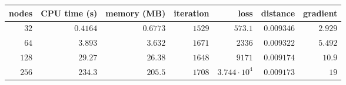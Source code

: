\documentclass[12pt,a4paper]{article}
\begin{document}
\begin{tabular}
{r | r | r | r | r | r | r}
nodes & CPU time (s) & memory (MB) & iteration & loss & distance & gradient \\
\hline
$32$ & $0.4164$ & $0.6773$ & $1529$ & $573.1$ & $0.009346$ & $2.929$ \\
$64$ & $3.893$ & $3.632$ & $1671$ & $2336$ & $0.009322$ & $5.492$ \\
$128$ & $29.27$ & $26.38$ & $1648$ & $9171$ & $0.009174$ & $10.9$ \\
$256$ & $234.3$ & $205.5$ & $1708$ & $3.744 \cdot 10^{4}$ & $0.009173$ & $19$ \\
\end{tabular}
\end{document}
